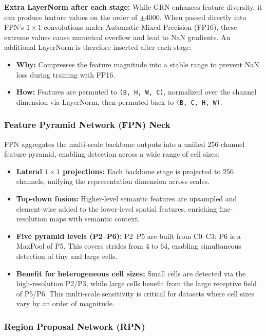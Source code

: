\documentclass[a4paper]{article} %
\begin{document}
\textbf{Extra LayerNorm after each stage:} While GRN enhances feature diversity, it can produce feature values on the order of $\pm 4000$. When passed directly into FPN's $1\times 1$ convolutions under Automatic Mixed Precision (FP16), these extreme values cause numerical overflow and lead to NaN gradients. An additional LayerNorm is therefore inserted after each stage:
\begin{itemize}
    \item \textbf{Why:} Compresses the feature magnitude into a stable range to prevent NaN loss during training with FP16.
    \item \textbf{How:} Features are permuted to \texttt{(B, H, W, C)}, normalized over the channel dimension via LayerNorm, then permuted back to \texttt{(B, C, H, W)}.
\end{itemize}

\subsubsection{Feature Pyramid Network (FPN) Neck}

FPN aggregates the multi-scale backbone outputs into a unified 256-channel feature pyramid, enabling detection across a wide range of cell sizes:
\begin{itemize}
    \item \textbf{Lateral $1\times1$ projections:} Each backbone stage is projected to 256 channels, unifying the representation dimension across scales.
    \item \textbf{Top-down fusion:} Higher-level semantic features are upsampled and element-wise added to the lower-level spatial features, enriching fine-resolution maps with semantic context.
    \item \textbf{Five pyramid levels (P2--P6):} P2--P5 are built from C0--C3; P6 is a MaxPool of P5. This covers strides from 4 to 64, enabling simultaneous detection of tiny and large cells.
    \item \textbf{Benefit for heterogeneous cell sizes:} Small cells are detected via the high-resolution P2/P3, while large cells benefit from the large receptive field of P5/P6. This multi-scale sensitivity is critical for datasets where cell sizes vary by an order of magnitude.
\end{itemize}

\subsubsection{Region Proposal Network (RPN)}
\end{document}
